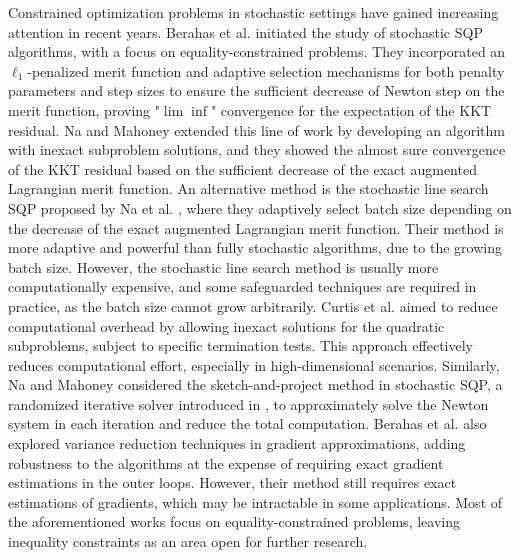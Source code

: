 \documentclass[aos]{imsart}
\numberwithin{equation}{section}
\theoremstyle{plain}
\begin{document}
Constrained optimization problems in stochastic settings have gained increasing attention in recent years.  
Berahas et al. \cite{berahas2021sequential} initiated the study of stochastic SQP algorithms, with a focus on equality-constrained problems.
They incorporated an $\ell_1$-penalized merit function and adaptive selection mechanisms for both penalty parameters and step sizes to ensure the sufficient decrease of Newton step on the merit function, proving "$\lim \inf$" convergence for the expectation of the KKT residual.
Na and Mahoney \cite{na2022asymptotic} extended this line of work by developing an algorithm with inexact subproblem solutions, and they showed the almost sure convergence of the KKT residual based on the sufficient decrease of the exact augmented Lagrangian merit function. 
An alternative method is the stochastic line search SQP proposed by Na et al. \cite{na2023adaptive}, where they adaptively select batch size depending on the decrease of the exact augmented Lagrangian merit function. 
Their method is more adaptive and powerful than fully stochastic algorithms, due to the growing batch size. 
However, the stochastic line search method is usually more computationally expensive, and some safeguarded techniques are required in practice, as the batch size cannot grow arbitrarily. 
Curtis et al. \cite{curtis2021inexact} aimed to reduce computational overhead by allowing inexact solutions for the quadratic subproblems, subject to specific termination tests. This approach effectively reduces computational effort, especially in high-dimensional scenarios.
Similarly, Na and Mahoney \cite{na2022asymptotic} considered the sketch-and-project method in stochastic SQP, a randomized iterative solver introduced in \cite{gower2015randomized}, to approximately solve the Newton system in each iteration and reduce the total computation. 
Berahas et al. \cite{berahas2023accelerating} also explored variance reduction techniques in gradient approximations, adding robustness to the algorithms at the expense of requiring exact gradient estimations in the outer loops. 
However, their method still requires exact estimations of gradients, which may be intractable in some applications. 
Most of the aforementioned works focus on equality-constrained problems, leaving inequality constraints as an area open for further research.
\end{document}
